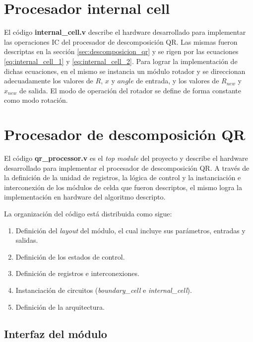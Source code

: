 \section{Procesador internal cell}

El código \textbf{internal\_cell.v} describe el hardware desarrollado para implementar las operaciones IC del procesador de descomposición QR. Las mismas fueron descriptas en la sección \ref{sec:descomposicion_qr} y se rigen por las ecuaciones \ref{eq:internal_cell_1} y \ref{eq:internal_cell_2}. Para lograr la implementación de dichas ecuaciones, en el mismo se instancia un módulo rotador y se direccionan adecuadamente los valores de $R$, $x$ y $angle$ de entrada, y los valores de $R_{new}$ y $x_{new}$ de salida. El modo de operación del rotador se define de forma constante como modo rotación.

\section{Procesador de descomposición QR}

El código \textbf{qr\_processor.v} es el \textit{top module} del proyecto y describe el hardware desarrollado para implementar el procesador de descomposición QR. A través de la definición de la unidad de registros, la lógica de control y la instanciación e interconexión de los módulos de celda que fueron descriptos, el mismo logra la implementación en hardware del algoritmo descripto.

La organización del código está distribuida como sigue:

\begin{enumerate}
	\item Definición del \textit{layout} del módulo, el cual incluye sus parámetros, entradas y salidas.
	\item Definición de los estados de control.
	\item Definición de registros e interconexiones.
	\item Instanciación de circuitos (\textit{boundary\_cell} e \textit{internal\_cell}).
	\item Definición de la arquitectura.
\end{enumerate}

\newpage

\subsection{Interfaz del módulo}

